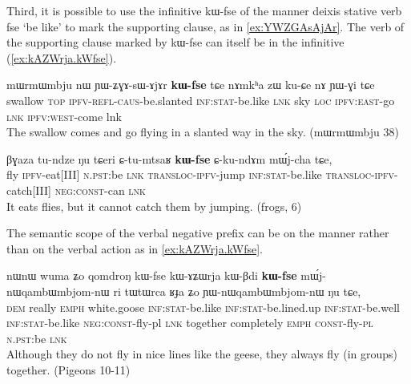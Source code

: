 \documentclass[oldfontcommands,oneside,a4paper,11pt]{article}
\newcommand{\ipa}[1]{{\phon \mbox{#1}}} %
\begin{document}
 

Third, it is possible to use the infinitive   \ipa{kɯ-fse} of the manner deixis stative verb \ipa{fse} `be like' to mark the supporting clause, as in \ref{ex:YWZGAsAjAr}. The verb of the supporting clause marked by   \ipa{kɯ-fse} can itself be in the infinitive (\ref{ex:kAZWrja.kWfse}).
\begin{exe}
\ex \label{ex:YWZGAsAjAr}
\gll
 	\ipa{mɯrmɯmbju} 	\ipa{nɯ} 	\ipa{ɲɯ-ʑɣɤ-sɯ-ɤjɤr} 	\ipa{\textbf{kɯ-fse}} 	\ipa{tɕe} 	\ipa{nɤmkʰa} 	\ipa{zɯ} 	\ipa{ku-ɕe} 	\ipa{nɤ} 	\ipa{ɲɯ-ɣi} 	\ipa{tɕe} 	\\
 	swallow \textsc{top} \textsc{ipfv-refl-caus}-be.slanted \textsc{inf:stat}-be.like \textsc{lnk} sky \textsc{loc}  \textsc{ipfv:east}-go \textsc{lnk} \textsc{ipfv:west}-come lnk \\
\glt The swallow comes and go flying in a slanted way in the sky. (mɯrmɯmbju 38)
\end{exe}

\begin{exe}
\ex \label{ex:YWZGAsAjAr}
\gll
\ipa{βɣaza}         	\ipa{tu-ndze}         	\ipa{ŋu}         	\ipa{tɕeri}         	\ipa{ɕ-tu-mtsaʁ}         	\ipa{\textbf{kɯ-fse}}         	\ipa{ɕ-ku-ndɤm}         	\ipa{mɯ́j-cha}         	\ipa{tɕe,}         \\
fly \textsc{ipfv}-eat[III] \textsc{n.pst}:be \textsc{lnk} \textsc{transloc-ipfv}-jump  \textsc{inf:stat}-be.like  \textsc{transloc-ipfv}-catch[III] \textsc{neg:const}-can \textsc{lnk} \\
\glt It eats flies, but it cannot catch them by jumping. (frogs, 6)
\end{exe}

The semantic scope of the verbal negative prefix can be on the manner rather than on the verbal action as in \ref{ex:kAZWrja.kWfse}.

\begin{exe}
\ex \label{ex:kAZWrja.kWfse}
\gll
\ipa{nɯnɯ} 	\ipa{wuma} 	\ipa{ʑo} 	\ipa{qomdroŋ} 	\ipa{kɯ-fse} 	\ipa{kɯ-ɤʑɯrja} 	\ipa{kɯ-βdi} 	\ipa{\textbf{kɯ-fse}} 	\ipa{mɯ́j-nɯqambɯmbjom-nɯ} 	\ipa{ri} \ipa{tɯtɯrca} 	\ipa{ʁɟa} 	\ipa{ʑo} 	\ipa{ɲɯ-nɯqambɯmbjom-nɯ} 	\ipa{ŋu} 	\ipa{tɕe,} 
\\
\textsc{dem} really \textsc{emph} white.goose  \textsc{inf:stat}-be.like  \textsc{inf:stat}-be.lined.up   \textsc{inf:stat}-be.well \textsc{inf:stat}-be.like \textsc{neg:const}-fly-pl \textsc{lnk} together completely \textsc{emph} \textsc{const}-fly-\textsc{pl} \textsc{n.pst}:be \textsc{lnk} \\
\glt Although they do not fly in nice lines like the geese, they always fly (in groups) together. (Pigeons 10-11)
\end{exe}
 
\end{document}
